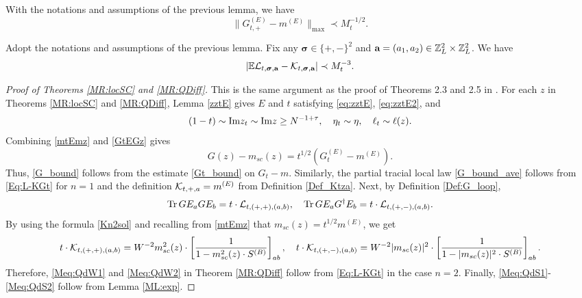 \begin{lemma}\label{ML:GtLocal}
   With the notations and assumptions of the previous lemma, we have 
\begin{equation}\label{Gt_bound}
 \|G^{(E)}_{t,+}-m^{(E)}\|_{\max}\prec M_{t}^{-1/2}.
   \end{equation} 
\end{lemma}
 


\begin{lemma}\label{ML:exp}
Adopt the notations and assumptions of the previous lemma. Fix any $\boldsymbol{\sigma}\in\{+,-\}^{2}$ and $\textbf{a}=(a_{1},a_{2})\in\mathbb{Z}_{L}^{2}\times\mathbb{Z}_{L}^{2}$. We have 
%
\begin{align}
|\mathbb{E}{\cal L}_{t,\boldsymbol{\sigma},\textbf{a}}-{\cal K}_{t,\boldsymbol{\sigma},\textbf{a}}|\prec M_{t}^{-3}.\label{eq:step6main}
\end{align}
%
\end{lemma}







\medskip 

\begin{proof}[Proof of Theorems \ref{MR:locSC} and \ref{MR:QDiff}]
This is the same argument as the proof of Theorems 2.3 and 2.5 in \cite{YY_25}. For each $z$ in Theorems \ref{MR:locSC} and \ref{MR:QDiff}, Lemma \ref{zztE} gives $E$ and $t$ satisfying \eqref{eq:zztE}, \eqref{eq:zztE2}, and
$$
(1-t) \sim \mathrm{Im} z_t \sim \mathrm{Im} z \geq N^{-1+\tau}, \quad \eta_t \sim \eta, \quad \ell_t \sim \ell(z).
$$
Combining \eqref{mtEmz} and \eqref{GtEGz} gives
\begin{equation}\label{Gmt1/2Gm}
G(z) - m_{sc}(z) = t^{1/2} \left(G_t^{(E)} - m^{(E)}\right).
\end{equation}
Thus, \eqref{G_bound} follows from the estimate \eqref{Gt_bound} on $G_t - m$. Similarly, the partial tracial local law \eqref{G_bound_ave} follows from \eqref{Eq:L-KGt} for $n=1$ and the definition ${\cal K}_{t,+,a}=m^{(E)}$ from Definition \ref{Def_Ktza}. Next, by Definition \ref{Def:G_loop},
\begin{equation}\label{Gmt1/2Gm2}
\operatorname{Tr} GE_aGE_b = t \cdot {\cal L}_{t, (+,+),(a,b)}, \quad \operatorname{Tr} GE_aG^\dagger E_b = t \cdot {\cal L}_{t, (+,-),(a,b)}.
\end{equation}
By using the formula \eqref{Kn2sol} and recalling from \eqref{mtEmz} that $m_{sc}(z)=t^{1/2}m^{(E)}$, we get
$$
t \cdot {\cal K}_{t, (+,+),(a,b)} = W^{-2} m^2_{sc}(z) \cdot \left[\frac{1}{1 - m^2_{sc}(z) \cdot S^{(B)}}\right]_{ab}, \quad t \cdot {\cal K}_{t, (+,-),(a,b)} = W^{-2} |m_{sc}(z)|^2 \cdot \left[\frac{1}{1 - |m_{sc}(z)|^2 \cdot S^{(B)}}\right]_{ab}.
$$
Therefore, \eqref{Meq:QdW1} and \eqref{Meq:QdW2} in Theorem \ref{MR:QDiff} follow from \eqref{Eq:L-KGt} in the case $n=2$. Finally, \eqref{Meq:QdS1}-\eqref{Meq:QdS2} follow from Lemma \ref{ML:exp}.
 \end{proof}




